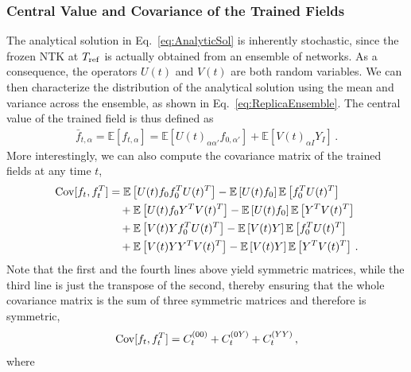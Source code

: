 \subsubsection{Central Value and Covariance of the Trained Fields}
\label{sec:CentralAndCovariance}

The analytical solution in Eq.~\eqref{eq:AnalyticSol} is inherently stochastic,
since the frozen NTK at $T_{\rm ref}$ is actually obtained from an ensemble of
networks. As a consequence, the operators $U(t)$ and $V(t)$ are both random
variables. We can then characterize the distribution of the analytical solution
using the mean and variance across the ensemble, as shown in
Eq.~\eqref{eq:ReplicaEnsemble}. The central value of the trained field is thus
defined as
\begin{align}
    \label{eq:MeanValAtT}
    \bar{f}_{t,\alpha} = \mathbb{E}\left[f_{t,\alpha}\right]
        = \mathbb{E}\left[U(t)_{\alpha\alpha'} f_{0,\alpha'}\right]
            + \mathbb{E}\left[V(t)_{\alpha I} Y_I\right] \, .
\end{align}
More interestingly, we can also compute the covariance matrix of the trained
fields at any time $t$,
\begin{align}
    \mathrm{Cov}[f_t,f_t^T]
        &= \mathbb{E}\left[U(t) f_0 f_0^T U(t)^T\right] 
            - \mathbb{E}\left[U(t) f_0\right] \mathbb{E}\left[f_0^T U(t)^T\right]  \nonumber \\
        &\quad + \mathbb{E}\left[U(t) f_0 Y^T V(t)^T\right] 
            - \mathbb{E}\left[U(t) f_0\right] \mathbb{E}\left[Y^T V(t)^T\right] \nonumber \\
        &\quad + \mathbb{E}\left[V(t) Y f_0^T U(t)^T\right]
            - \mathbb{E}\left[V(t) Y\right] \mathbb{E}\left[f_0^T U(t)^T\right] \nonumber \\
    \label{eq:CovAtT}
        &\quad + \mathbb{E}\left[V(t) Y Y^T V(t)^T\right]
            - \mathbb{E}\left[V(t) Y\right] \mathbb{E}\left[Y^T V(t)^T\right] \, .
\end{align}
Note that the first and the fourth lines above yield symmetric matrices, while
the third line is just the transpose of the second, thereby ensuring that the
whole covariance matrix is the sum of three symmetric matrices and therefore is
symmetric, 
\begin{align}
    \label{eq:SumOfCovariances}
    \mathrm{Cov}[f_t,f_t^T] = C_t^{(00)} + C_t^{(0Y)} + C_t^{(YY)}\, ,
\end{align}
where
